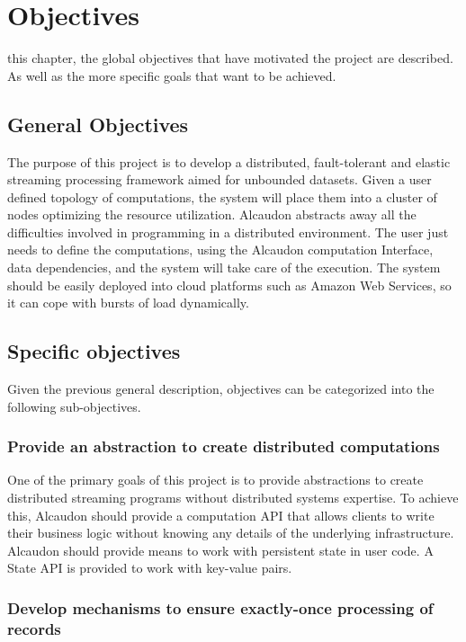 \chapter{Objectives}
\label{chap:objectives}

 this chapter, the global objectives that have motivated the project
are described. As well as the more specific goals that want to be achieved.

\section{General Objectives}

The purpose of this project is to develop a distributed, fault-tolerant and
elastic streaming processing framework aimed for unbounded datasets. Given a
user defined topology of computations, the system will place them into a cluster
of nodes optimizing the resource utilization. Alcaudon abstracts away all the
difficulties involved in programming in a distributed environment. The user just
needs to define the computations, using the Alcaudon computation Interface, data
dependencies, and the system will take care of the execution. The system should be
easily deployed into cloud platforms such as Amazon Web Services, so it can cope
with bursts of load dynamically.

\section{Specific objectives}

Given the previous general description, objectives can be categorized into the
following sub-objectives.

\subsection{Provide an abstraction to create distributed computations}
One of the primary goals of this project is to provide abstractions to create
distributed streaming programs without distributed systems expertise. To achieve
this, Alcaudon should provide a computation API that allows clients to write
their business logic without knowing any details of the underlying
infrastructure.
Alcaudon should provide means to work with persistent state in user code. A
State API is provided to work with key-value pairs.

\subsection{Develop mechanisms to ensure exactly-once processing of records}


